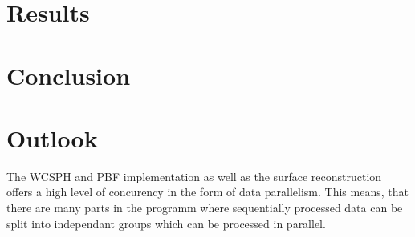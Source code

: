 \documentclass[11pt, letterpaper, twocolumn]{article}
\begin{document}


\section*{Results}
\label{sec:results}


\section*{Conclusion}
\label{sec:conclusion}



\section*{Outlook}
\label{sec:future}
The WCSPH and PBF implementation as well as the surface reconstruction offers a high level of concurency in the form of data parallelism. This means, that there are many parts in the programm where sequentially processed data can be split into independant groups which can be processed in parallel.




{\footnotesize
}



\end{document}
